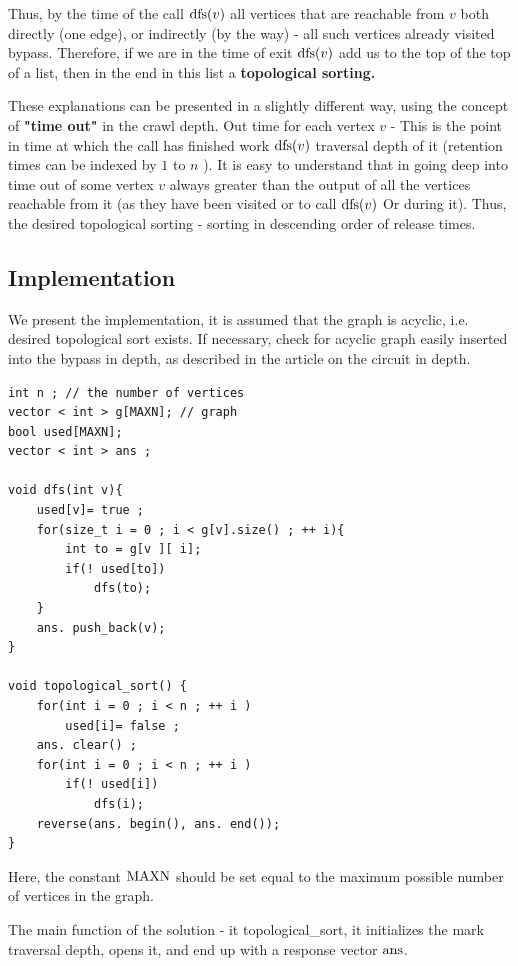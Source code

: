 Thus, by the time of the call ${\rm dfs} (v)$ all vertices that are reachable from $v$ both directly (one edge), or indirectly (by the way) - all such vertices already visited bypass. Therefore, if we are in the time of exit ${\rm dfs} (v)$ add us to the top of the top of a list, then in the end in this list a \textbf{topological sorting.}

These explanations can be presented in a slightly different way, using the concept of \textbf{"time out"} in the crawl depth. Out time for each vertex $v$ - This is the point in time at which the call has finished work ${\rm dfs} (v)$ traversal depth of it (retention times can be indexed by $1$ to $n$ ). It is easy to understand that in going deep into time out of some vertex $v$ always greater than the output of all the vertices reachable from it (as they have been visited or to call ${\rm dfs} (v)$ Or during it). Thus, the desired topological sorting - sorting in descending order of release times.

\subsection{ Implementation }

We present the implementation, it is assumed that the graph is acyclic, i.e. desired topological sort exists. If necessary, check for acyclic graph easily inserted into the bypass in depth, as described in the article on the circuit in depth.

\begin{verbatim}
int n ; // the number of vertices
vector < int > g[MAXN]; // graph
bool used[MAXN];
vector < int > ans ;
 
void dfs(int v){
    used[v]= true ;
    for(size_t i = 0 ; i < g[v].size() ; ++ i){
        int to = g[v ][ i];
        if(! used[to])
            dfs(to);
    }
    ans. push_back(v);
}
 
void topological_sort() {
    for(int i = 0 ; i < n ; ++ i )
        used[i]= false ;
    ans. clear() ;
    for(int i = 0 ; i < n ; ++ i )
        if(! used[i])
            dfs(i);
    reverse(ans. begin(), ans. end());
} 
\end{verbatim}
Here, the constant $\rm MAXN$ should be set equal to the maximum possible number of vertices in the graph.

The main function of the solution - it topological\_sort, it initializes the mark traversal depth, opens it, and end up with a response vector $\rm ans$.

